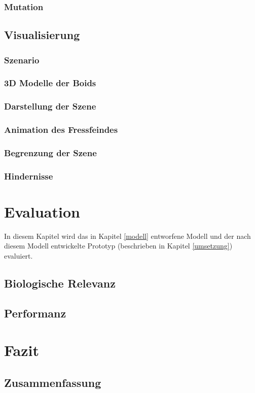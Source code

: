 \documentclass[draft=false
              ,paper=a4
              ,twoside=false
              ,fontsize=11pt
              ,headsepline
              ,BCOR10mm
              ,DIV11
              ,bibtotoc
              ,liststotoc
              ]{scrbook}
\begin{document}
\subsection{Mutation}
\section{Visualisierung}
\subsection{Szenario}
\subsection{3D Modelle der Boids}
\subsection{Darstellung der Szene}
\subsection{Animation des Fressfeindes}
\subsection{Begrenzung der Szene}
\subsection{Hindernisse}

\chapter{Evaluation}\label{eval}
In diesem Kapitel wird das in Kapitel \ref{modell} entworfene Modell und der nach diesem Modell entwickelte Prototyp (beschrieben in Kapitel \ref{umsetzung}) evaluiert.
\section{Biologische Relevanz}
\section{Performanz}

\chapter{Fazit}\label{fazit}
\section{Zusammenfassung}
\end{document}

